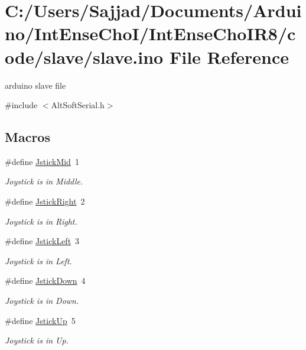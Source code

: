 \hypertarget{slave_8ino}{}\section{C\+:/\+Users/\+Sajjad/\+Documents/\+Arduino/\+Int\+Ense\+Cho\+I/\+Int\+Ense\+Cho\+I\+R8/code/slave/slave.ino File Reference}
\label{slave_8ino}


arduino slave file  


{\ttfamily \#include $<$Alt\+Soft\+Serial.\+h$>$}\newline
\subsection*{Macros}
\begin{DoxyCompactItemize}
\item 
\mbox{\label{slave_8ino_ac4a0d1542e118f06f6f0997629d9ab84}} 
\#define \mbox{\hyperlink{slave_8ino_ac4a0d1542e118f06f6f0997629d9ab84}{Jstick\+Mid}}~1
\begin{DoxyCompactList}\small\item\em Joystick is in Middle. \end{DoxyCompactList}\item 
\mbox{\label{slave_8ino_a9b93a0effb9c09248bcba85a28c48b8d}} 
\#define \mbox{\hyperlink{slave_8ino_a9b93a0effb9c09248bcba85a28c48b8d}{Jstick\+Right}}~2
\begin{DoxyCompactList}\small\item\em Joystick is in Right. \end{DoxyCompactList}\item 
\mbox{\label{slave_8ino_ad0d7429c7c26609751ca64fa94acb32c}} 
\#define \mbox{\hyperlink{slave_8ino_ad0d7429c7c26609751ca64fa94acb32c}{Jstick\+Left}}~3
\begin{DoxyCompactList}\small\item\em Joystick is in Left. \end{DoxyCompactList}\item 
\mbox{\label{slave_8ino_acc8a88b497450472b81c5f95b9c3a605}} 
\#define \mbox{\hyperlink{slave_8ino_acc8a88b497450472b81c5f95b9c3a605}{Jstick\+Down}}~4
\begin{DoxyCompactList}\small\item\em Joystick is in Down. \end{DoxyCompactList}\item 
\mbox{\label{slave_8ino_a74824f5ea0f46df119320d99c9c287f3}} 
\#define \mbox{\hyperlink{slave_8ino_a74824f5ea0f46df119320d99c9c287f3}{Jstick\+Up}}~5
\begin{DoxyCompactList}\small\item\em Joystick is in Up. \end{DoxyCompactList}\end{DoxyCompactItemize}
